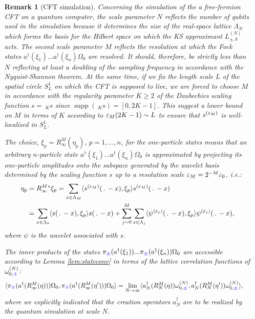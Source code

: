 \documentclass[a4paper, 11pt]{article}
\DeclareMathOperator{\1}{\mathds{1}}
\DeclareMathOperator{\supp}{supp}
\newtheorem{rem}[thm]{Remark}
\begin{document}
\begin{rem}[CFT simulation]
\label{rem:stateapprox}
Concerning the simulation of the a free-fermion CFT on a quantum computer, the scale parameter $N$ reflects the number of qubits used in the simulation because it determines the size of the real-space lattice $\Lambda_{N}$ which forms the basis for the Hilbert space on which the KS approximant $L^{(N)}_{\pm,k}$ acts. The second scale parameter $M$ reflects the resolution at which the Fock states $a^{\dagger}(\xi_{1})\dots a^{\dagger}(\xi_{n})\Omega_{0}$ are resolved. It should, therefore, be strictly less than $N$ reflecting at least a doubling of the sampling frequency in accordance with the Nyquist-Shannon theorem. At the same time, if we fix the length scale $L$ of the spatial circle $S^{1}_{L}$ on which the CFT is supposed to live, we are forced to choose $M$ in accordance with the regularity parameter $K\geq 2$ of the Daubechies scaling function $s=\!\ _{K}s$ since $\supp(\!\ _{K}s)=[0,2K-1]$. This suggest a lower bound on $M$ in terms of $K$ according to $\varepsilon_{M}(2K-1)\sim L$ to ensure that $s^{(\varepsilon_{M})}$ is well-localized in $S^{1}_{L}$.

The choice, $\xi_{p}=R^{M}_{\infty}(\eta_{p})$, $p=1,\dots,n$, for the one-particle states means that an arbitrary $n$-particle state $a^{\dagger}(\xi_{1})\dots a^{\dagger}(\xi_{n})\Omega_{0}$ is approximated by projecting its one-particle amplitudes onto the subspace generated by the wavelet basis determined by the scaling function $s$ up to a resolution scale $\varepsilon_{M} = 2^{-M}\varepsilon_{0}$, i.e.:
\begin{align*}
\eta_{p} & = R^{M}_{\infty}{}^{*}\xi_{p} = \sum_{x\in\Lambda_{M}}\langle s^{(\vep_{M})}(\!\ .\!\ -x),\xi_{p}\rangle s^{(\vep_{M})}(\!\ .\!\ -x) \\ 
& = \sum_{x\in\Lambda_{0}}\langle s(\!\ .\!\ -x),\xi_{p}\rangle s(\!\ .\!\ -x) + \sum_{j=0}^{M}\sum_{x\in\Lambda_{j}}\langle \psi^{(\vep_{j})}(\!\ .\!\ -x),\xi_{p}\rangle \psi^{(\vep_{j})}(\!\ .\!\ -x),
\end{align*}
where $\psi$ is the wavelet associated with $s$.

The inner products of the states $\pi_{{\color{blue}\pm}}(a^{\dagger}(\xi_{1}))...\pi_{{\color{blue}\pm}}(a^{\dagger}(\xi_{n}))\Omega_{0}$ are accessible according to Lemma \ref{lem:stateconv} in terms of the lattice correlation functions of $\omega^{(N)}_{0,{\color{blue}\pm}}$:
\begin{align*}
\langle \pi_{{\color{blue}\pm}}(a^{\dagger}(R^{M}_{\infty}(\eta)))\Omega_{0},\pi_{{\color{blue}\pm}}(a^{\dagger}(R^{M}_{\infty}(\eta')))\Omega_{0}\rangle & = \lim_{N\rightarrow\infty}\langle a^{\dagger}_{N}(R^{M}_{N}(\eta))\omega^{(N)}_{0,{\color{blue}\pm}},a^{\dagger}_{N}(R^{M}_{N}(\eta'))\omega^{(N)}_{0,{\color{blue}\pm}}\rangle,
\end{align*}
where we explicitly indicated that the creation operators $a^{\dagger}_{N}$ are to be realized by the quantum simulation at scale $N$.
\end{rem}
\end{document}
